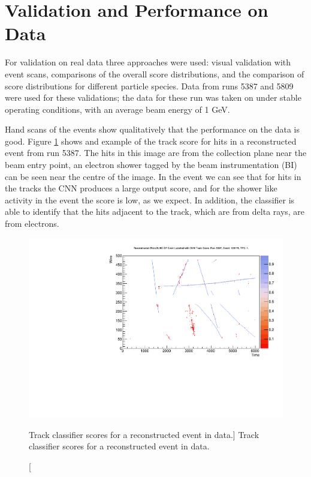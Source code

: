 \section{Validation and Performance on \protodune{} Data} \label{cnn-perf-data}

For validation on real \protodune{} data three approaches were used: visual
validation with event scans, comparisons of the overall score distributions, 
and the comparison of score distributions for different particle species. Data 
from \protodune{} runs 5387 and 5809 were used for these validations; the data 
for these run was taken on under stable operating conditions, with an average 
beam energy of 1 GeV.

Hand scans of the events show qualitatively that the performance on the data is
good. Figure \ref{fig:real_event} shows and example of the track score for hits
in a reconstructed event from run 5387. The hits in this image are from the
collection plane near the beam entry point, an electron shower tagged by the
beam instrumentation (BI) can be seen near the centre of the image. In the event
we can see that for hits in the tracks the CNN produces a large output score,
and for the shower like activity in the event the score is low, as we expect. In
addition, the classifier is able to identify that the hits adjacent to the 
track, which are from delta rays, are from electrons.

\begin{figure}
	\centering
	\includegraphics[width=\textwidth]{figures/run5387_tpc1_view2_128178.pdf}
	\caption
	[Track classifier scores for a reconstructed event in \protodune{} data.]
	{Track classifier scores for a reconstructed event in \protodune{} data.}
	\label{fig:real_event}
\end{figure}

